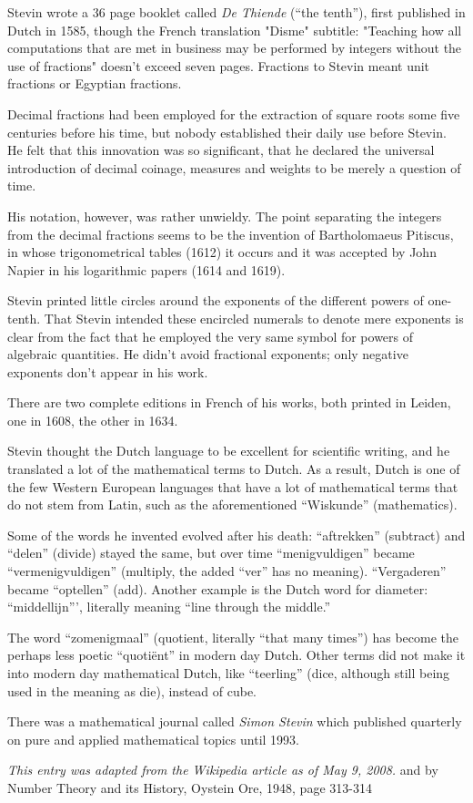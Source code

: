 \documentclass[12pt]{article}
\begin{document}
Stevin wrote a 36 page booklet called {\it De Thiende} (``the tenth''), first published in Dutch in 1585, though the French translation "Disme" subtitle: "Teaching how all computations that are met in business may be performed by integers without the use of fractions" doesn't exceed seven pages. Fractions to Stevin meant unit fractions or Egyptian fractions. 

Decimal fractions had been employed for the extraction of square roots some five centuries before his time, but nobody established their daily use before Stevin. He felt that this innovation was so significant, that he declared the universal introduction of decimal coinage, measures and weights to be merely a question of time.

His notation, however, was rather unwieldy. The point separating the integers from the decimal fractions seems to be the invention of Bartholomaeus Pitiscus, in whose trigonometrical tables (1612) it occurs and it was accepted by John Napier in his logarithmic papers (1614 and 1619). 

Stevin printed little circles around the exponents of the different powers of one-tenth. That Stevin intended these encircled numerals to denote mere exponents is clear from the fact that he employed the very same symbol for powers of algebraic quantities. He didn't avoid fractional exponents; only negative exponents don't appear in his work.

There are two complete editions in French of his works, both printed in Leiden, one in 1608, the other in 1634.

Stevin thought the Dutch language to be excellent for scientific writing, and he translated a lot of the mathematical terms to Dutch. As a result, Dutch is one of the few Western European languages that have a lot of mathematical terms that do not stem from Latin, such as the aforementioned ``Wiskunde'' (mathematics).

Some of the words he invented evolved after his death: ``aftrekken'' (subtract) and ``delen'' (divide) stayed the same, but over time ``menigvuldigen'' became ``vermenigvuldigen'' (multiply, the added ``ver'' has no meaning). ``Vergaderen'' became ``optellen'' (add). Another example is the Dutch word for diameter: ``middellijn''', literally meaning ``line through the middle.''

The word ``zomenigmaal'' (quotient, literally ``that many times'') has become the perhaps less poetic ``quoti\"ent'' in modern day Dutch. Other terms did not make it into modern day mathematical Dutch, like ``teerling'' (dice, although still being used in the meaning as die), instead of cube.

There was a mathematical journal called {\it Simon Stevin} which published quarterly on pure and applied mathematical topics until 1993.

{\it This entry was adapted from the Wikipedia article  as of May 9, 2008.}
and by Number Theory and its History, Oystein Ore, 1948,  page 313-314
\end{document}

